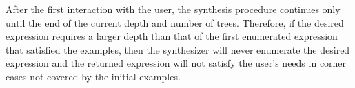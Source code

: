After the first interaction with the user, the synthesis procedure continues only until the end of the current depth and number of trees. Therefore, if the desired expression requires a larger depth than that of the first enumerated expression that satisfied the examples, then the synthesizer will never enumerate the desired expression and the returned expression will not satisfy the user's needs in corner cases not covered by the initial examples.



